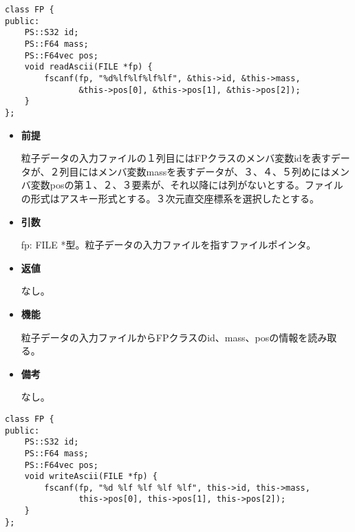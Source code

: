
\begin{screen}
\begin{verbatim}
class FP {
public:
    PS::S32 id;
    PS::F64 mass;
    PS::F64vec pos;
    void readAscii(FILE *fp) {
        fscanf(fp, "%d%lf%lf%lf%lf", &this->id, &this->mass,
               &this->pos[0], &this->pos[1], &this->pos[2]);
    }
};
\end{verbatim}
\end{screen}

\begin{itemize}

\item {\bf 前提}

  粒子データの入力ファイルの１列目にはFPクラスのメンバ変数idを表すデー
  タが、２列目にはメンバ変数massを表すデータが、３、４、５列めにはメン
  バ変数posの第１、２、３要素が、それ以降には列がないとする。ファイル
  の形式はアスキー形式とする。３次元直交座標系を選択したとする。

\item {\bf 引数}

  fp: FILE *型。粒子データの入力ファイルを指すファイルポインタ。
  
\item {\bf 返値}

  なし。
  
\item {\bf 機能}

  粒子データの入力ファイルからFPクラスのid、mass、posの情報を読み取る。
  
\item {\bf 備考}

  なし。
  
\end{itemize}


\begin{screen}
\begin{verbatim}
class FP {
public:
    PS::S32 id;
    PS::F64 mass;
    PS::F64vec pos;
    void writeAscii(FILE *fp) {
        fscanf(fp, "%d %lf %lf %lf %lf", this->id, this->mass,
               this->pos[0], this->pos[1], this->pos[2]);
    }
};
\end{verbatim}
\end{screen}


